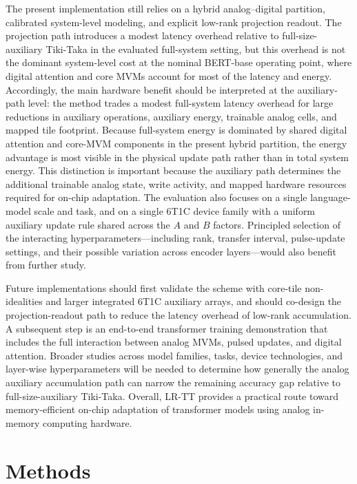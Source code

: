 \documentclass[fleqn,10pt]{wlscirep}
\begin{document}
\noindent
The present implementation still relies on a hybrid analog--digital partition, calibrated system-level modeling, and explicit low-rank projection readout. The projection path introduces a modest latency overhead relative to full-size-auxiliary Tiki-Taka in the evaluated full-system setting, but this overhead is not the dominant system-level cost at the nominal BERT-base operating point, where digital attention and core MVMs account for most of the latency and energy. Accordingly, the main hardware benefit should be interpreted at the auxiliary-path level: the method trades a modest full-system latency overhead for large reductions in auxiliary operations, auxiliary energy, trainable analog cells, and mapped tile footprint. Because full-system energy is dominated by shared digital attention and core-MVM components in the present hybrid partition, the energy advantage is most visible in the physical update path rather than in total system energy. This distinction is important because the auxiliary path determines the additional trainable analog state, write activity, and mapped hardware resources required for on-chip adaptation. The evaluation also focuses on a single language-model scale and task, and on a single 6T1C device family with a uniform auxiliary update rule shared across the \(A\) and \(B\) factors. Principled selection of the interacting hyperparameters---including rank, transfer interval, pulse-update settings, and their possible variation across encoder layers---would also benefit from further study.

\noindent
Future implementations should first validate the scheme with core-tile non-idealities and larger integrated 6T1C auxiliary arrays, and should co-design the projection-readout path to reduce the latency overhead of low-rank accumulation. A subsequent step is an end-to-end transformer training demonstration that includes the full interaction between analog MVMs, pulsed updates, and digital attention. Broader studies across model families, tasks, device technologies, and layer-wise hyperparameters will be needed to determine how generally the analog auxiliary accumulation path can narrow the remaining accuracy gap relative to full-size-auxiliary Tiki-Taka. Overall, LR-TT provides a practical route toward memory-efficient on-chip adaptation of transformer models using analog in-memory computing hardware.

\section{Methods}
\label{sec:methods}
\end{document}
